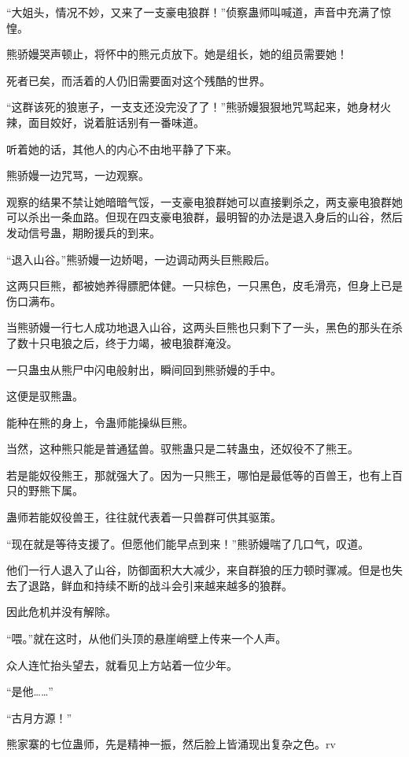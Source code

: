\begin{this_body}
“大姐头，情况不妙，又来了一支豪电狼群！”侦察蛊师叫喊道，声音中充满了惊惶。

熊骄嫚哭声顿止，将怀中的熊元贞放下。她是组长，她的组员需要她！

死者已矣，而活着的人仍旧需要面对这个残酷的世界。

“这群该死的狼崽子，一支支还没完没了了！”熊骄嫚狠狠地咒骂起来，她身材火辣，面目姣好，说着脏话别有一番味道。

听着她的话，其他人的内心不由地平静了下来。

熊骄嫚一边咒骂，一边观察。

观察的结果不禁让她暗暗气馁，一支豪电狼群她可以直接剿杀之，两支豪电狼群她可以杀出一条血路。但现在四支豪电狼群，最明智的办法是退入身后的山谷，然后发动信号蛊，期盼援兵的到来。

“退入山谷。”熊骄嫚一边娇喝，一边调动两头巨熊殿后。

这两只巨熊，都被她养得膘肥体健。一只棕色，一只黑色，皮毛滑亮，但身上已是伤口满布。

当熊骄嫚一行七人成功地退入山谷，这两头巨熊也只剩下了一头，黑色的那头在杀了数十只电狼之后，终于力竭，被电狼群淹没。

一只蛊虫从熊尸中闪电般射出，瞬间回到熊骄嫚的手中。

这便是驭熊蛊。

能种在熊的身上，令蛊师能操纵巨熊。

当然，这种熊只能是普通猛兽。驭熊蛊只是二转蛊虫，还奴役不了熊王。

若是能奴役熊王，那就强大了。因为一只熊王，哪怕是最低等的百兽王，也有上百只的野熊下属。

蛊师若能奴役兽王，往往就代表着一只兽群可供其驱策。

“现在就是等待支援了。但愿他们能早点到来！”熊骄嫚喘了几口气，叹道。

他们一行人退入了山谷，防御面积大大减少，来自群狼的压力顿时骤减。但是也失去了退路，鲜血和持续不断的战斗会引来越来越多的狼群。

因此危机并没有解除。

“喂。”就在这时，从他们头顶的悬崖峭壁上传来一个人声。

众人连忙抬头望去，就看见上方站着一位少年。

“是他……”

“古月方源！”

熊家寨的七位蛊师，先是精神一振，然后脸上皆涌现出复杂之色。rv

\end{this_body}

